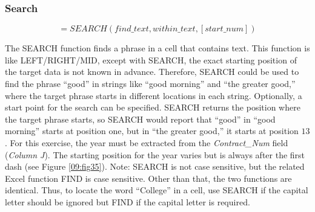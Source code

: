 \subsubsection{Search}	

\[ =SEARCH(find\_text, within\_text, [start\_num]) \]

The SEARCH function finds a phrase in a cell that contains text. This function is like LEFT/RIGHT/MID, except with SEARCH, the exact starting position of the target data is not known in advance. Therefore, SEARCH could be used to find the phrase ``good'' in strings like ``good morning'' and ``the greater good,'' where the target phrase starts in different locations in each string. Optionally, a start point for the search can be specified. SEARCH returns the position where the target phrase starts, so SEARCH would report that ``good'' in ``good morning'' starts at position one, but in ``the greater good,'' it starts at position $ 13 $. For this exercise, the year must be extracted from the \textit{Contract\_Num} field (\textit{Column J}). The starting position for the year varies but is always after the first dash (see Figure \ref{09:fig35}). Note: SEARCH is not case sensitive, but the related Excel function FIND is case sensitive. Other than that, the two functions are identical. Thus, to locate the word ``College'' in a cell, use SEARCH if the capital letter should be ignored but FIND if the capital letter is required.

